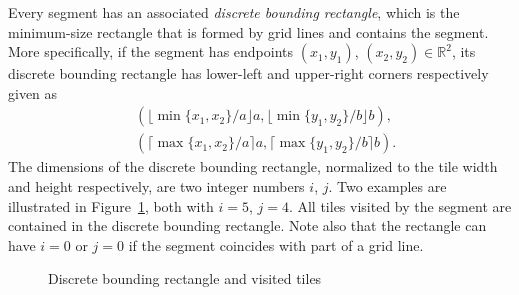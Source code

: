 \documentclass[12pt, a4paper]{article}
\begin{document}
Every segment has an associated \emph{discrete bounding rectangle}, which is the minimum-size rectangle that is formed by grid lines and contains the segment. More specifically, if the segment has endpoints $(x_1,y_1)$, $(x_2,y_2) \in \mathbb R^2$, its discrete bounding rectangle has lower-left and upper-right corners respectively given as
\begin{align*}
& (\lfloor\min\{x_1, x_2\}/a\rfloor a, \lfloor\min\{y_1,y_2\}/b\rfloor b), \\
& (\lceil\max\{x_1, x_2\}/a \rceil a, \lceil\max\{y_1,y_2\}/b \rceil b).
\end{align*}
The dimensions of the discrete bounding rectangle, normalized to the tile width and height respectively, are two integer numbers $i$, $j$. Two examples are illustrated in Figure~\ref{fig: discrete bounding rectangle and touched tiles}, both with $i=5$, $j=4$. All tiles visited by the segment are contained in the discrete bounding rectangle. Note also that the rectangle can have $i=0$ or $j=0$ if the segment coincides with part of a grid line.

\begin{figure}
\centering%
\hfill%
%
\caption{Discrete bounding rectangle and visited tiles
}%
\label{fig: discrete bounding rectangle and touched tiles}%
\end{figure}%
\end{document}
